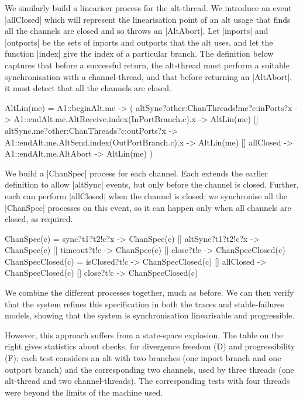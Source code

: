 We similarly build a lineariser process for the alt-thread.  We introduce an
event |allClosed| which will represent the linearisation point of an alt usage
that finds all the channels are closed and so throws an |AltAbort|.  
%
Let |inports| and |outports| be the sets of inports and outports that the alt
uses, and let the function |index| give the index of a particular branch.  The
definition below captures that before a successful return, the alt-thread must
perform a suitable synchronisation with a channel-thread, and that before
returning an |AltAbort|, it must detect that all the channels are closed. 
%
\begin{cspm}
AltLin(me) = 
  A1::beginAlt.me -> (
    altSync?other:ChanThreads!me?c:inPorts?x -> 
       A1::endAlt.me.AltReceive.index(InPortBranch.c).x -> AltLin(me)
    [] altSync.me?other:ChanThreads?c:outPorts?x -> 
          A1::endAlt.me.AltSend.index(OutPortBranch.c).x -> AltLin(me)
    [] allClosed -> A1::endAlt.me.AltAbort -> AltLin(me)
  )
\end{cspm}

We build a |ChanSpec| process for each channel.  Each extends the earlier
definition to allow |altSync| events, but only before the channel is closed.
Further, each can perform |allClosed| when the channel is closed; we
synchronise all the |ChanSpec| processes on this event, so it can happen only
when all channels are closed, as required.
%
\begin{cspm}
ChanSpec(c) = 
  sync?t1?t2!c?x -> ChanSpec(c) [] altSync?t1?t2!c?x -> ChanSpec(c) 
  [] timeout?t!c -> ChanSpec(c)   [] close?t!c -> ChanSpecClosed(c)
ChanSpecClosed(c) =
  isClosed?t!c -> ChanSpecClosed(c) [] allClosed -> ChanSpecClosed(c) [] close?t!c -> ChanSpecClosed(c)
\end{cspm}

We combine the different processes together, much as before.  We can then
verify that the system refines this specification in both the traces and
stable-failures models, showing that the system is synchronisation
linearisable and progressible.

\begin{window}
%
However, this approach suffers from a state-space explosion.  The table on the
right gives statistics about checks, for divergence freedom (D) and
progressibility (F); each test considers an alt with two branches (one inport
branch and one outport branch) and the corresponding two channels, used by
three threads (one alt-thread and two channel-threads).  The corresponding
tests with four threads were beyond the limits of the machine used. 
\end{window}
